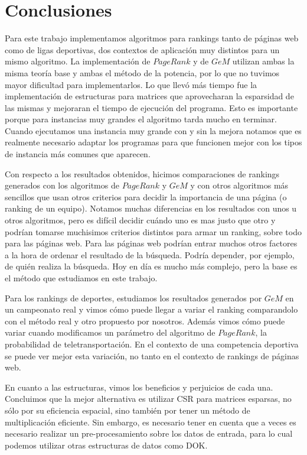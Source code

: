 \section{Conclusiones}

Para este trabajo implementamos algoritmos para rankings tanto de páginas web como de ligas deportivas, dos contextos de aplicación muy distintos para un mismo algoritmo. La implementación de $PageRank$ y de $GeM$ utilizan ambas la misma teoría base y ambas el método de la potencia, por lo que no tuvimos mayor dificultad para implementarlos. Lo que llevó más tiempo fue la implementación de estructuras para matrices que aprovecharan la esparsidad de las mismas y mejoraran el tiempo de ejecución del programa. Esto es importante porque para instancias muy grandes el algoritmo tarda mucho en terminar. Cuando ejecutamos una instancia muy grande con y sin la mejora notamos que es realmente necesario adaptar los programas para que funcionen mejor con los tipos de instancia más comunes que aparecen.

Con respecto a los resultados obtenidos, hicimos comparaciones de rankings generados con los algoritmos de $PageRank$ y $GeM$ y con otros algoritmos más sencillos que usan otros criterios para decidir la importancia de una página (o ranking de un equipo). Notamos muchas diferencias en los resultados con unos u otros algoritmos, pero es difícil decidir cuándo uno es mas justo que otro y podrían tomarse muchisimos criterios distintos para armar un ranking, sobre todo para las páginas web. Para las páginas web podrían entrar muchos otros factores a la hora de ordenar el resultado de la búsqueda. Podría depender, por ejemplo, de quién realiza la búsqueda. Hoy en día es mucho más complejo, pero la base es el método que estudiamos en este trabajo. 

Para los rankings de deportes, estudiamos los resultados generados por $GeM$ en un campeonato real y vimos cómo puede llegar a variar el ranking comparandolo con el método real y otro propuesto por nosotros. Además vimos cómo puede variar cuando modificamos un parámetro del algoritmo de $PageRank$, la probabilidad de teletransportación. En el contexto de una competencia deportiva se puede ver mejor esta variación, no tanto en el contexto de rankings de páginas web.


En cuanto a las estructuras, vimos los beneficios y perjuicios de cada una. Concluimos que la mejor alternativa es utilizar CSR para matrices esparsas, no sólo por su eficiencia espacial, sino también por tener un método de multiplicación eficiente. Sin embargo, es necesario tener en cuenta que a veces es necesario realizar un pre-procesamiento sobre los datos de entrada, para lo cual podemos utilizar otras estructuras de datos como DOK.










